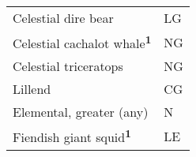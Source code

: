 \begin{longtable}{llll}
{\begin{minipage}[t]{0.601in}
\end{minipage}}\\
\hline
\multicolumn{1}{|p{3.326in}|}{\begin{minipage}[t]{3.326in}\raggedright
Celestial dire bear\end{minipage}} & \multicolumn{3}{p{0.601in}|}{\begin{minipage}[t]{0.601in}\raggedright
LG\end{minipage}}\\
\hline
\multicolumn{1}{|p{3.326in}|}{\begin{minipage}[t]{3.326in}\raggedright
Celestial cachalot whale\textsuperscript{\textbf{1}}\end{minipage}} & \multicolumn{3}{p{0.601in}|}{\begin{minipage}[t]{0.601in}\raggedright
NG\end{minipage}}\\
\hline
\multicolumn{1}{|p{3.326in}|}{\begin{minipage}[t]{3.326in}\raggedright
Celestial triceratops\end{minipage}} & \multicolumn{3}{p{0.601in}|}{\begin{minipage}[t]{0.601in}\raggedright
NG\end{minipage}}\\
\hline
\multicolumn{1}{|p{3.326in}|}{\begin{minipage}[t]{3.326in}\raggedright
Lillend\end{minipage}} & \multicolumn{3}{p{0.601in}|}{\begin{minipage}[t]{0.601in}\raggedright
CG\end{minipage}}\\
\hline
\multicolumn{1}{|p{3.326in}|}{\begin{minipage}[t]{3.326in}\raggedright
Elemental, greater (any)\end{minipage}} & \multicolumn{3}{p{0.601in}|}{\begin{minipage}[t]{0.601in}\raggedright
N\end{minipage}}\\
\hline
\multicolumn{1}{|p{3.326in}|}{\begin{minipage}[t]{3.326in}\raggedright
Fiendish giant squid\textsuperscript{\textbf{1}}\end{minipage}} & \multicolumn{3}{p{0.601in}|}{\begin{minipage}[t]{0.601in}\raggedright
LE\end{minipage}}\\

\end{longtable}
